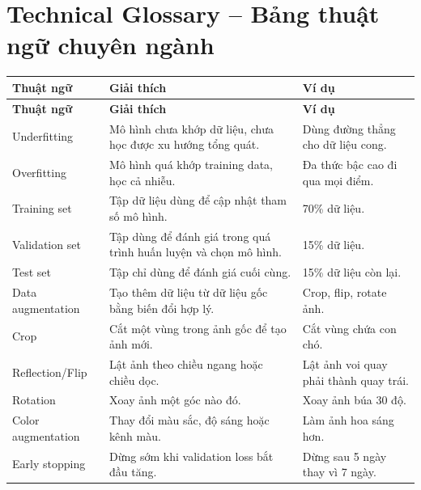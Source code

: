 \section{Technical Glossary -- Bảng thuật ngữ chuyên ngành}

\small
\begin{longtable}{p{}p{}p{}}
\toprule
\textbf{Thuật ngữ} & \textbf{Giải thích} & \textbf{Ví dụ} \\
\midrule
\endfirsthead

\toprule
\textbf{Thuật ngữ} & \textbf{Giải thích} & \textbf{Ví dụ} \\
\midrule
\endhead

Underfitting & Mô hình chưa khớp dữ liệu, chưa học được xu hướng tổng quát. & Dùng đường thẳng cho dữ liệu cong. \\

Overfitting & Mô hình quá khớp training data, học cả nhiễu. & Đa thức bậc cao đi qua mọi điểm. \\

Training set & Tập dữ liệu dùng để cập nhật tham số mô hình. & 70\% dữ liệu. \\

Validation set & Tập dùng để đánh giá trong quá trình huấn luyện và chọn mô hình. & 15\% dữ liệu. \\

Test set & Tập chỉ dùng để đánh giá cuối cùng. & 15\% dữ liệu còn lại. \\

Data augmentation & Tạo thêm dữ liệu từ dữ liệu gốc bằng biến đổi hợp lý. & Crop, flip, rotate ảnh. \\

Crop & Cắt một vùng trong ảnh gốc để tạo ảnh mới. & Cắt vùng chứa con chó. \\

Reflection/Flip & Lật ảnh theo chiều ngang hoặc chiều dọc. & Lật ảnh voi quay phải thành quay trái. \\

Rotation & Xoay ảnh một góc nào đó. & Xoay ảnh búa 30 độ. \\

Color augmentation & Thay đổi màu sắc, độ sáng hoặc kênh màu. & Làm ảnh hoa sáng hơn. \\

Early stopping & Dừng sớm khi validation loss bắt đầu tăng. & Dừng sau 5 ngày thay vì 7 ngày. \\


\end{longtable}

